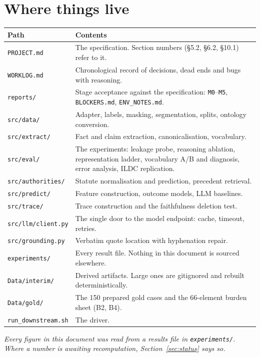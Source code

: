 \documentclass[12pt,a4paper]{article}
\newcommand{\code}[1]{\texttt{\small #1}}
\begin{document}
\section{Where things live}

\begin{center}
\small
\begin{tabular}{@{}lp{9.4cm}@{}}
\toprule
\textbf{Path} & \textbf{Contents} \\
\midrule
\code{PROJECT.md}       & The specification. Section numbers (§5.2, §6.2, §10.1) refer to it. \\
\code{WORKLOG.md}       & Chronological record of decisions, dead ends and bugs with reasoning. \\
\code{reports/}         & Stage acceptance against the specification: \code{M0}--\code{M5},
                          \code{BLOCKERS.md}, \code{ENV\_NOTES.md}. \\
\code{src/data/}        & Adapter, labels, masking, segmentation, splits, ontology conversion. \\
\code{src/extract/}     & Fact and claim extraction, canonicalisation, vocabulary. \\
\code{src/eval/}        & The experiments: leakage probe, reasoning ablation, representation
                          ladder, vocabulary A/B and diagnosis, error analysis, ILDC replication. \\
\code{src/authorities/} & Statute normalisation and prediction, precedent retrieval. \\
\code{src/predict/}     & Feature construction, outcome models, LLM baselines. \\
\code{src/trace/}       & Trace construction and the faithfulness deletion test. \\
\code{src/llm/client.py} & The single door to the model endpoint: cache, timeout, retries. \\
\code{src/grounding.py} & Verbatim quote location with hyphenation repair. \\
\code{experiments/}     & Every result file. Nothing in this document is sourced elsewhere. \\
\code{Data/interim/}    & Derived artifacts. Large ones are gitignored and rebuilt deterministically. \\
\code{Data/gold/}       & The 150 prepared gold cases and the 66-element burden sheet (B2, B4). \\
\code{run\_downstream.sh} & The driver. \\
\bottomrule
\end{tabular}
\end{center}

\vfill
\begin{center}
\small\emph{Every figure in this document was read from a results file in \code{experiments/}.
Where a number is awaiting recomputation, Section~\ref{sec:status} says so.}
\end{center}
\end{document}
